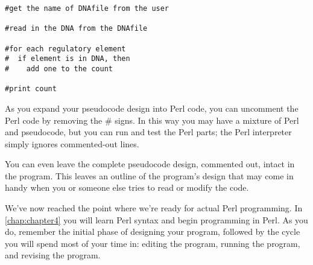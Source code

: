 \begin{lstlisting}
#get the name of DNAfile from the user

#read in the DNA from the DNAfile

#for each regulatory element
#  if element is in DNA, then
#    add one to the count

#print count
\end{lstlisting}

As you expand your pseudocode design into Perl code, you can uncomment the Perl code by removing the \# signs. In this way you may have a mixture of Perl and pseudocode, but you can run and test the Perl parts; the Perl interpreter simply ignores commented-out lines.

You can even leave the complete pseudocode design, commented out, intact in the program. This leaves an outline of the program's design that may come in handy when you or someone else tries to read or modify the code.

We've now reached the point where we're ready for actual Perl programming. In \ref{chap:chapter4} you will learn Perl syntax and begin programming in Perl. As you do, remember the initial phase of designing your program, followed by the cycle you will spend most of your time in: editing the program, running the program, and revising the program. 
